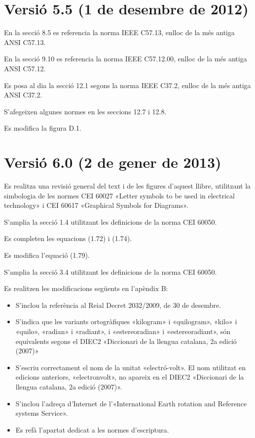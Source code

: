 \section*{Versió 5.5 (1 de desembre de 2012)}

En la secció 8.5 es referencia la norma  IEEE C57.13, enlloc de la més antiga ANSI C57.13.

En la secció 9.10 es referencia la norma  IEEE C57.12.00, enlloc de la més antiga ANSI C57.12.

Es posa al dia la secció 12.1 segons la norma IEEE C37.2, enlloc de la més antiga ANSI C37.2.

S'afegeixen algunes normes en les seccions 12.7 i 12.8.

Es modifica  la figura D.1.


\section*{Versió 6.0 (2 de gener de 2013)}

Es realitza una revisió general del text i de les figures d'aquest  llibre, utilitzant la simbologia de les normes CEI 60027  «Letter symbols to be used in electrical technology» i  CEI 60617  «Graphical Symbols for Diagrams».

S'amplia la secció 1.4 utilitzant les definicions de la norma CEI 60050.

Es completen les equacions (1.72) i (1.74).

Es modifica l'equació (1.79).

S'amplia la secció  3.4 utilitzant les definicions de la norma CEI 60050.

Es realitzen les modificacions següents en l'apèndix B:
\begin{itemize}
   \item  S'inclou la referència al Reial Decret 2032/2009, de 30 de desembre.
   \item S'indica que les variants ortogràfiques  «kilogram»
    i «quilogram», «kilo» i «quilo», «radian» i «radiant», i
   «estereoradian» i «estereoradiant», són equivalents segons el DIEC2 «Diccionari de la llengua catalana, 2a edició (2007)»
    \item S'escriu correctament el nom de la unitat «electró-volt». El nom  utilitzat en edicions anteriors,   «electronvolt», no apareix en el DIEC2 «Diccionari de la llengua catalana, 2a edició (2007)».
    \item S'inclou l'adreça d'Internet de l'«International Earth rotation and Reference systems Service».
     \item Es refà l'apartat dedicat a les normes d'escriptura.
\end{itemize}


